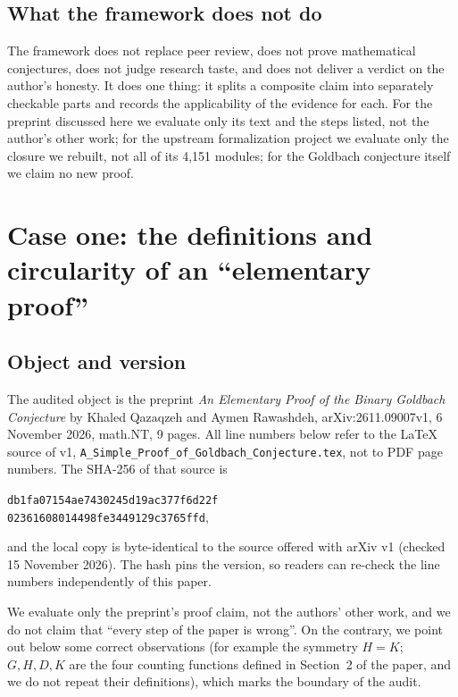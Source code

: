 \documentclass[11pt,a4paper]{article}
\theoremstyle{plain}
\theoremstyle{definition}
\begin{document}
\subsection{What the framework does not do}
\label{sec:not-do}

The framework does not replace peer review, does not prove mathematical conjectures, does not judge research taste, and does not deliver a verdict on the author's honesty. It does one thing: it splits a composite claim into separately checkable parts and records the applicability of the evidence for each. For the preprint discussed here we evaluate only its text and the steps listed, not the author's other work; for the upstream formalization project we evaluate only the closure we rebuilt, not all of its 4,151 modules; for the Goldbach conjecture itself we claim no new proof.

\section{Case one: the definitions and circularity of an ``elementary proof''}
\label{sec:paper}

\subsection{Object and version}
\label{sec:paper-object}

The audited object is the preprint \emph{An Elementary Proof of the Binary Goldbach Conjecture} by Khaled Qazaqzeh and Aymen Rawashdeh, arXiv:2611.09007v1, 6 November 2026, math.NT, 9 pages\cite{qazaqzeh}. All line numbers below refer to the LaTeX source of v1, \texttt{A\_Simple\_Proof\_of\_Goldbach\_Conjecture.tex}, not to PDF page numbers. The SHA-256 of that source is
\begin{center}
\texttt{db1fa07154ae7430245d19ac377f6d22f\\02361608014498fe3449129c3765ffd},
\end{center}
and the local copy is byte-identical to the source offered with arXiv v1 (checked 15 November 2026). The hash pins the version, so readers can re-check the line numbers independently of this paper.

We evaluate only the preprint's proof claim, not the authors' other work, and we do not claim that ``every step of the paper is wrong''. On the contrary, we point out below some correct observations (for example the symmetry $H=K$; $G,H,D,K$ are the four counting functions defined in Section~2 of the paper, and we do not repeat their definitions), which marks the boundary of the audit.
\end{document}
